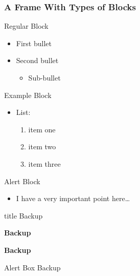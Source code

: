 \documentclass[aspectratio=1610]{beamer}
\begin{document}
\begin{frame}
  \frametitle{A Frame With Types of Blocks}
  \begin{block}{Regular Block}
  \begin{itemize}
  \item First bullet
  \item Second bullet
    \begin{itemize}
    \item Sub-bullet
    \end{itemize}
  \end{itemize}
  \end{block}
  \begin{exampleblock}{Example Block}
  \begin{itemize}
  \item List:
    \begin{enumerate}
    \item item one
    \item item two
    \item item three
    \end{enumerate}
  \end{itemize}
  \end{exampleblock}
  \begin{alertblock}{Alert Block}
    \begin{itemize}
    \item I have a very important point here\ldots
    \end{itemize}
  \end{alertblock}
\end{frame}



\begin{NCARprettyframe}
  \vspace{3em}
  \begin{beamercolorbox}[sep=8pt,center]{title}
    \Huge{Backup}
  \end{beamercolorbox}
  \begin{exampleblock}{}
    \centering
    \textbf{Backup}
  \end{exampleblock}
  \begin{block}{}
    \centering
    \textbf{Backup}
  \end{block}
  \begin{alertblock}{}
    \centering
    Alert Box Backup
  \end{alertblock}

\end{NCARprettyframe}
\end{document}
